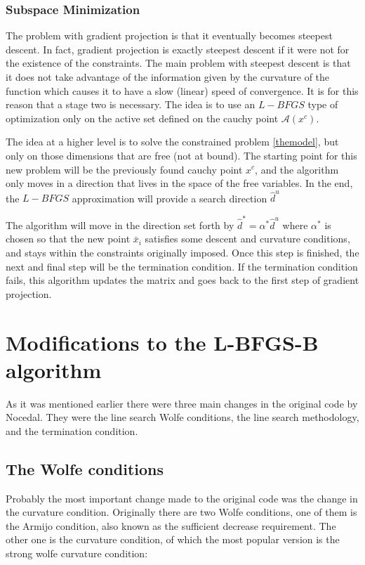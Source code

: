 \subsection{Subspace Minimization}

The problem with gradient projection is that it eventually becomes steepest descent. In fact, gradient projection is exactly steepest descent if it were not for the existence of the constraints. The main problem with steepest descent is that it does not take advantage of the information given by the curvature of the function which causes it to have a slow (linear) speed of convergence. It is for this reason that a stage two is necessary. The idea is to use an $L-BFGS$ type of optimization only on the active set defined on the cauchy point $\mathcal{A}(x^c)$.

The idea at a higher level is to solve the constrained problem \ref{themodel}, but only on those dimensions that are free (not at bound). The starting point for this new problem will be the previously found cauchy point $x^c$, and the algorithm only moves in a direction that lives in the space of the free variables. In the end, the $L-BFGS$ approximation will provide a search direction $\hat{d}^u$

The algorithm will move in the direction set forth by $\hat{d}^* = \alpha^* \hat{d}^u$ where $\alpha^*$ is chosen so that the new point $\bar{x}_i$ satisfies some descent and curvature conditions, and stays within the constraints originally imposed. Once this step is finished, the next and final step will be the termination condition. If the termination condition fails, this algorithm updates the matrix and goes back to the first step of gradient projection.

\chapter{Modifications to the L-BFGS-B algorithm}

As it was mentioned earlier there were three main changes in the original code by Nocedal\citep{lbfgsbsoftware}. They were the line search Wolfe conditions, the line search methodology, and the termination condition.

\section{The Wolfe conditions}

Probably the most important change made to the original code was the change in the curvature condition. Originally there are two Wolfe conditions, one of them is the Armijo condition, also known as the sufficient decrease requirement. The other one is the curvature condition, of which the most popular version is the strong wolfe curvature condition:

